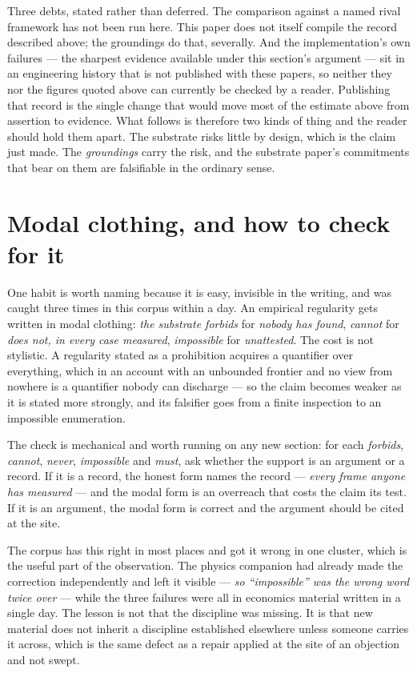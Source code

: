 \documentclass[11pt,a4paper]{article}
\theoremstyle{remark}\newtheorem{remark}[definition]{Remark}
\begin{document}
\medskip
Three debts, stated rather than deferred. The comparison against a named rival framework has not been
run here. This paper does not itself compile the record described above; the groundings do that,
severally. And the implementation's own failures --- the sharpest evidence available under this
section's argument --- sit in an engineering history that is not published with these papers, so
neither they nor the figures quoted above can currently be checked by a reader. Publishing that record
is the single change that would move most of the estimate above from assertion to evidence. What follows is therefore two kinds of thing and the reader should
hold them apart. The substrate risks little by design, which is the claim just made. The
\emph{groundings} carry the risk, and the substrate paper's commitments that bear on them are falsifiable in the
ordinary sense.

\section{Modal clothing, and how to check for it}\label{sec:modal}
One habit is worth naming because it is easy, invisible in the writing, and was caught three times in
this corpus within a day. An empirical regularity gets written in modal clothing: \emph{the substrate
forbids} for \emph{nobody has found}, \emph{cannot} for \emph{does not, in every case measured},
\emph{impossible} for \emph{unattested}. The cost is not stylistic. A regularity stated as a
prohibition acquires a quantifier over everything, which in an account with an unbounded frontier and
no view from nowhere is a quantifier nobody can discharge --- so the claim becomes weaker as it is
stated more strongly, and its falsifier goes from a finite inspection to an impossible enumeration.

The check is mechanical and worth running on any new section: for each \emph{forbids}, \emph{cannot},
\emph{never}, \emph{impossible} and \emph{must}, ask whether the support is an argument or a record. If
it is a record, the honest form names the record --- \emph{every frame anyone has measured} --- and the
modal form is an overreach that costs the claim its test. If it is an argument, the modal form is
correct and the argument should be cited at the site.

The corpus has this right in most places and got it wrong in one cluster, which is the useful part of
the observation. The physics companion had already made the correction independently and left it
visible --- \emph{so ``impossible'' was the wrong word twice over} --- while the three failures were all
in economics material written in a single day. The lesson is not that the discipline was missing. It is
that new material does not inherit a discipline established elsewhere unless someone carries it across,
which is the same defect as a repair applied at the site of an objection and not swept.
\end{document}
